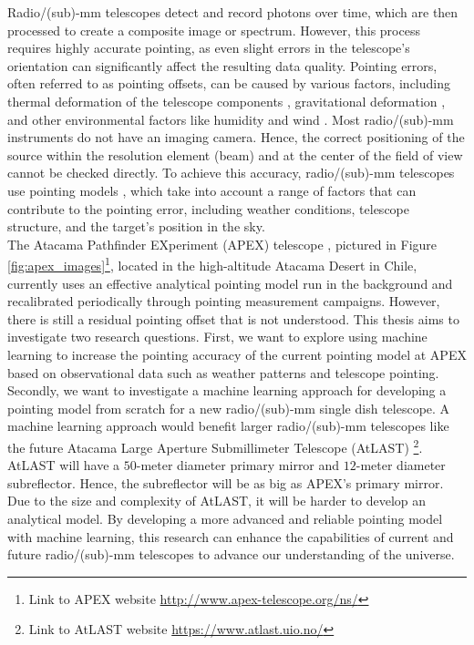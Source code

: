 Radio/(sub)-mm telescopes detect and record photons over time, which are then processed to create a composite image or spectrum.
However, this process requires highly accurate pointing, as even slight errors in the telescope's orientation can significantly affect the resulting data quality.
Pointing errors, often referred to as pointing offsets, can be caused by various factors, including thermal deformation of the telescope components \cite{Dong2018},
gravitational deformation \cite{GravDeformation}, and other environmental factors like humidity \cite{Corstanje2017} and wind \cite{Gawronski2005}.
Most radio/(sub)-mm instruments do not have an imaging camera.
Hence, the correct positioning of the source within the resolution element (beam) and at the center of the field of view cannot be checked directly.
To achieve this accuracy, radio/(sub)-mm telescopes use pointing models \cite{stumpff1972}, which take into account a range of factors that can contribute to the pointing error,
including weather conditions, telescope structure, and the target's position in the sky.\\

The Atacama Pathfinder EXperiment (APEX) telescope \cite{APEX2006}, pictured in Figure \ref{fig:apex_images}\footnote[1]{Link to APEX website \href{http://www.apex-telescope.org/ns/}{http://www.apex-telescope.org/ns/}}, located in the high-altitude Atacama Desert in Chile,
currently uses an effective analytical pointing model run in the background and recalibrated periodically through pointing measurement campaigns.
However, there is still a residual pointing offset that is not understood.
This thesis aims to investigate two research questions.
First, we want to explore using machine learning to increase the pointing accuracy of the current pointing model at APEX based on observational data such as weather patterns and telescope pointing.
Secondly, we want to investigate a machine learning approach for developing a pointing model from scratch for a new radio/(sub)-mm single dish telescope.
A machine learning approach would benefit larger radio/(sub)-mm telescopes like the future Atacama Large Aperture Submillimeter Telescope (AtLAST)
\footnote[2]{Link to AtLAST website \href{https://www.atlast.uio.no/}{https://www.atlast.uio.no/}}.
AtLAST will have a $50$-meter diameter primary mirror and $12$-meter diameter subreflector. Hence, the subreflector will be as big as APEX's primary mirror.
Due to the size and complexity of AtLAST, it will be harder to develop an analytical model.
By developing a more advanced and reliable pointing model with machine learning,
this research can enhance the capabilities of current and future radio/(sub)-mm telescopes to advance our understanding of the universe.



